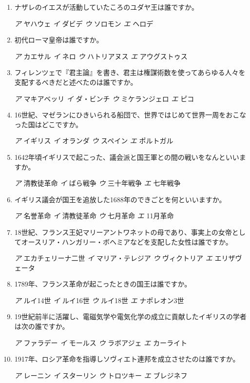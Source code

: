 \documentclass[dvipdfmx,uplatex]{bxjsarticle}
\newcommand{\sentakusi}[4]{
\hspace{.3zw}
\emph{ア}\hspace{1zw} #1 \hspace{2zw} \emph{イ} \hspace{1zw}#2 \hspace{2zw}\emph{ウ}\hspace{1zw} #3 \hspace{2zw}\emph{エ}\hspace{1zw} #4

}
\begin{document}
\begin{enumerate}


  
\setlength{\parskip}{.4zw}
\setlength{\itemsep}{.4zw}




\item ナザレのイエスが活動していたころのユダヤ王は誰ですか。

  \sentakusi{ヤハウェ}{ダビデ}{ソロモン}{ヘロデ}

  
  
\item 初代ローマ皇帝は誰ですか。

  \sentakusi{カエサル}{ネロ}{ハトリアヌス}{アウグストゥス}

  
\item フィレンツェで『君主論』を書き、君主は権謀術数を使ってあらゆる人々を支配するべきだと述べたのは誰ですか。

  \sentakusi{マキアベッリ}{ダ・ビンチ}{ミケランジェロ}{ピコ}


\item 16世紀、マゼランにひきいられる船団で、世界ではじめて世界一周をおこなった国はどこですか。

  \sentakusi{イギリス}{オランダ}{スペイン}{ポルトガル}

  
\item 1642年頃イギリスで起こった、議会派と国王軍との間の戦いをなんといいますか。

\sentakusi{清教徒革命}{ばら戦争}{三十年戦争}{七年戦争}


\item イギリス議会が国王を追放した1688年のできごとを何といいますか。

\sentakusi{名誉革命}{清教徒革命}{七月革命}{11月革命}


\item 18世紀、フランス王妃マリーアントワネットの母であり、事実上の女帝としてオースリア・ハンガリー・ボヘミアなどを支配した女性は誰ですか。

  \sentakusi{エカチェリーナ二世}{マリア・テレジア}{ヴィクトリア}{エリザヴェータ}

\item 1789年、フランス革命が起こったときの国王は誰ですか。

\sentakusi{ルイ14世}{ルイ16世}{ルイ18世}{ナポレオン3世}



\item 19世紀前半に活躍し、電磁気学や電気化学の成立に貢献したイギリスの学者は次の誰ですか。

  \sentakusi{ファラデー}{モールス}{ラボアジェ}{カーライト}


\item 1917年、ロシア革命を指導しソヴィエト連邦を成立させたのは誰ですか。

  \sentakusi{レーニン}{スターリン}{トロツキー}{ブレジネフ}

  



\end{enumerate}
\end{document}
